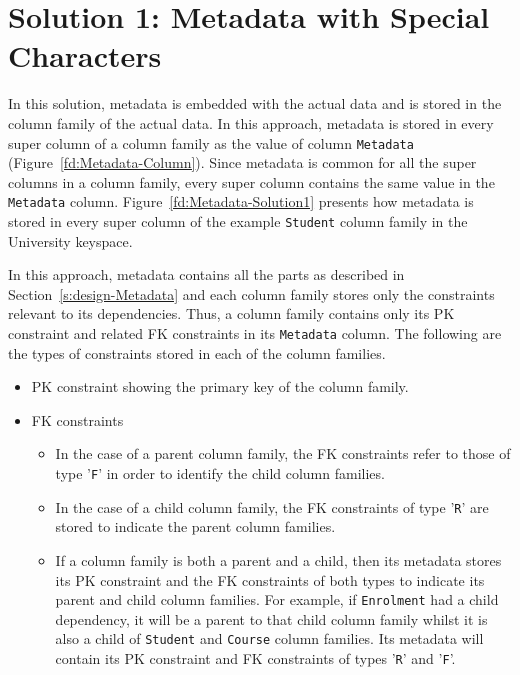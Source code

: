 
\section{Solution 1:  Metadata with Special Characters} \label{s:design-sol1}

In this  solution,   metadata is embedded with the actual data and is
stored in the column family of the actual data.  In this approach,  metadata is
stored in every super column of a column family  as the value of column
\texttt{Metadata} (Figure~\ref{fd:Metadata-Column}).  Since metadata is
common for all the super columns in a column family,  every super column
contains the same  value in the \texttt{Metadata} column. 
Figure~\ref{fd:Metadata-Solution1} presents how metadata is stored in every
super column of the example \texttt{Student} column family in the University
keyspace. 
	
 
		
In this approach,  metadata contains all the parts as 
described in Section~\ref{s:design-Metadata} and each column family stores only
the constraints relevant to its dependencies.  Thus,  a column family contains
only its \ac{PK} constraint and related \ac{FK} constraints in its
\texttt{Metadata} column.  The following are the types of constraints stored in
each of the column families. 
	
		\begin{itemize}
		  \item  \ac{PK} constraint showing the primary key of the column family. 
		  \item \ac{FK} constraints 
				\begin{itemize}
					\item In the case of a parent column family, the \ac{FK} constraints refer
					to those of type '\texttt{F}' in order to identify the child column
					families.
					\item  In the case of a child column family, the \ac{FK} constraints of
					type '\texttt{R}' are stored to indicate the parent column families. 
					\item If a column family is both a parent and a child,  then its metadata
					stores its \ac{PK} constraint and the \ac{FK} constraints of both types to
					indicate its parent and child column families. For example, if
					\texttt{Enrolment} had a child dependency, it will be a parent to
					that child column family whilst it is also a child of \texttt{Student} and
					\texttt{Course} column families. Its metadata will contain its \ac{PK}
					constraint and \ac{FK} constraints of types '\texttt{R}' and '\texttt{F}'.
				\end{itemize}
		\end{itemize}
		

